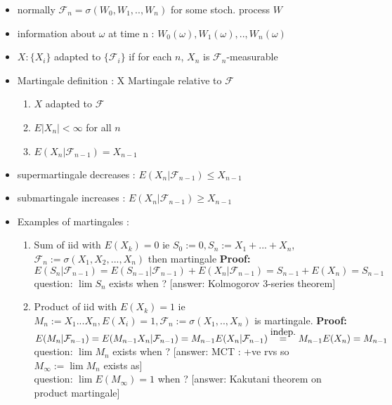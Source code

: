 \documentclass[10pt,landscape,a4paper]{article}
\newcommand{\myFF}{\mathcal{F}}
\newcommand\myeq[1]{\stackrel{{\normalfont\mbox{#1}}}{ = }}
\begin{document}
\begin{multicols*}{3}
\begin{spacing}{0.5}
\begin{itemize}
\item normally $\mathcal{F}_n = \sigma (W_0,W_1,..,W_n)$ for some stoch. process $W$

\item information about $\omega$ at time n : $W_0(\omega),W_1(\omega),..,W_n(\omega)$

\item $X : \{X_i\}$ adapted to $\{\mathcal{F}_i\}$ if for each $n$, $X_n$ is $\mathcal{F}_n$-measurable

\item \colorbox{green!10}{Martingale definition} : X Martingale relative to $\mathcal{F}$
\begin{enumerate}
\item $X$ adapted to $\mathcal{F}$
\item $E{|X_n|} < \infty$ for all $n$
\item $E(X_n|{\mathcal{F}}_{n-1})=X_{n-1}$
\end{enumerate}

\item supermartingale decreases : $E(X_n|{\mathcal{F}}_{n-1}) \le X_{n-1}$
\item submartingale increases : $E(X_n|{\mathcal{F}}_{n-1}) \ge X_{n-1}$

\item Examples of martingales :
\begin{enumerate}

\item  \colorbox{green!10}{Sum of iid with $E(X_k)=0$ } ie $S_0:=0, S_n := X_1 + ...+ X_n$, $\mathcal{F}_{n}:= \sigma(X_1,X_2,...,X_n)$ then martingale \textbf{Proof:} $E(S_n|\mathcal{F}_{n-1})= E(S_{n-1}|\mathcal{F}_{n-1}) + E(X_n|\mathcal{F}_{n-1})=S_{n-1}+E(X_n)=S_{n-1}$ \\ \colorbox{red!10}{question}: $\lim S_n$ exists when ? [answer: Kolmogorov 3-series theorem]

\item  \colorbox{green!10}{Product of iid with $E(X_k)=1$ } ie $ M_n := X_1 ... X_n, E(X_i)=1, \myFF_n := \sigma(X_1,..,X_n)$ is martingale. \textbf{Proof:} $E(M_n|\myFF_{n-1}) = E(M_{n-1}X_n|\myFF_{n-1}) = M_{n-1} E(X_n|\myFF_{n-1}) \myeq{indep.} M_{n-1} E(X_n) = M_{n-1} $  \\ \colorbox{red!10}{question}: $\lim M_n$ exists when ? [answer: MCT : +ve rvs so $M_{\infty} := \lim M_n$ exists as] \\ \colorbox{red!10}{question}: $\lim E(M_{\infty})=1$ when ? [answer: Kakutani theorem on product martingale] 


\end{enumerate}
\end{itemize}
\end{spacing}
\end{multicols*}
\end{document}
